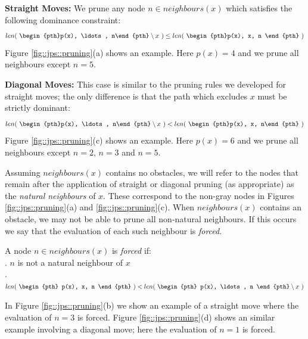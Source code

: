 \par \noindent
\textbf{Straight Moves:} We prune any node $n \in neighbours(x)$ which 
satisfies the following dominance constraint:
\begin{equation}
len(~\begin{pth}p(x), \ldots, n\end{pth} \setminus x~)
\leq len(~\begin{pth}p(x), x, n \end{pth}~)
\end{equation}
Figure \ref{fig::jps::pruning}(a) shows an example. Here $p(x) = 4$ and we prune
 all neighbours except $n = 5$.
\par \noindent
\textbf{Diagonal Moves:} This case is similar to the pruning rules we developed
for straight moves; the only difference is that the path which excludes $x$ must 
be strictly dominant: 
\begin{equation}
len(~\begin{pth}p(x), \ldots, n\end{pth} \setminus x~) < len(~\begin{pth}p(x), x, n\end{pth}~)
\end{equation}
Figure \ref{fig::jps::pruning}(c) shows an example. Here $p(x) = 6$ and we prune all
neighbours except $n = 2$, $n = 3$ and $n = 5$.  
\par
Assuming $neighbours(x)$ contains no obstacles, we will refer to the nodes
that remain after the application of straight or diagonal pruning (as
appropriate) as the \emph{natural neighbours} of $x$. These correspond to the non-gray
nodes in Figures \ref{fig::jps::pruning}(a) and \ref{fig::jps::pruning}(c).
When $neighbours(x)$ contains an obstacle, we may not be able to prune
all non-natural neighbours. If this occurs we say that the evaluation of each
such neighbour is \emph{forced}.

\begin{definition}
\label{def::jps::forced}
A node $n \in neighbours(x)$ is \emph{forced} if: \\
. $n$ is not a natural neighbour of $x$\\
. $ len(~\begin{pth} p(x), x, n \end{pth}~) < len(~ \begin{pth} p(x), \ldots, n \end{pth} \setminus x~)$
\end{definition}
\par \noindent
In Figure \ref{fig::jps::pruning}(b) we show an example of a straight move where 
the evaluation of $n = 3$ is forced. Figure \ref{fig::jps::pruning}(d)  
shows an similar example involving a diagonal move; here the evaluation of
$n = 1$ is forced.
